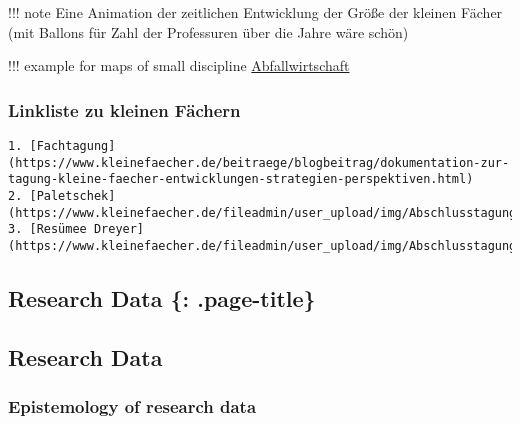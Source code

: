 !!! note Eine Animation der zeitlichen Entwicklung der Größe der kleinen
Fächer (mit Ballons für Zahl der Professuren über die Jahre wäre schön)

!!! example for maps of small discipline
\href{https://www.kleinefaecher.de/kartierung/kleine-faecher-von-a-z.html?tx_dmdb_monitoring\%5BdisciplineTaxonomy\%5D=200\&cHash=7926d252f10df8873f7beff649ce65e5}{Abfallwirtschaft}

\hypertarget{linkliste-zu-kleinen-fuxe4chern}{%
\subsubsection{Linkliste zu kleinen
Fächern}\label{linkliste-zu-kleinen-fuxe4chern}}

\begin{verbatim}
1. [Fachtagung](https://www.kleinefaecher.de/beitraege/blogbeitrag/dokumentation-zur-tagung-kleine-faecher-entwicklungen-strategien-perspektiven.html)
2. [Paletschek](https://www.kleinefaecher.de/fileadmin/user_upload/img/Abschlusstagung_2019_Der_Blick_der_Universitaetsgeschichte_auf_die_Kleinen_Faecher_Paletschek.pdf)
3. [Resümee Dreyer](https://www.kleinefaecher.de/fileadmin/user_upload/img/Abschlusstagung_2019_Strategische_Weiterentwicklung_Kleiner_Faecher_Dreyer.pdf)
\end{verbatim}

\hypertarget{research-data-.page-title}{%
\subsection{Research Data \{:
.page-title\}}\label{research-data-.page-title}}

\hypertarget{research-data}{%
\subsection{Research Data}\label{research-data}}

\hypertarget{epistemology-of-research-data}{%
\subsubsection{Epistemology of research
data}\label{epistemology-of-research-data}}

